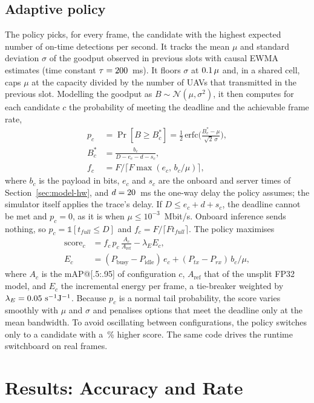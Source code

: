 \documentclass[journal,twocolumn,10pt]{IEEEtran}
\begin{document}
\subsection{Adaptive policy}
The policy picks, for every frame, the candidate with the highest expected number of on-time detections per second. It tracks the mean $\mu$ and standard deviation $\sigma$ of the goodput observed in previous slots with causal EWMA estimates (time constant $\tau=200$~ms). It floors $\sigma$ at $0.1\,\mu$ and, in a shared cell, caps $\mu$ at the capacity divided by the number of UAVs that transmitted in the previous slot. Modelling the goodput as $B\sim\mathcal{N}(\mu,\sigma^2)$, it then computes for each candidate $c$ the probability of meeting the deadline and the achievable frame rate,
\begin{align*}
p_c &= \Pr[B\ge B^\ast_c] = \tfrac12\,\mathrm{erfc}\Big(\frac{B^\ast_c-\mu}{\sqrt2\,\sigma}\Big),\\
B^\ast_c &= \frac{b_c}{D-e_c-d-s_c},\\
f_c &= F\big/\big\lceil F\max(e_c,\,b_c/\mu)\big\rceil,
\end{align*}
where $b_c$ is the payload in bits, $e_c$ and $s_c$ are the onboard and server times of Section~\ref{sec:model-hw}, and $d=20$~ms the one-way delay the policy assumes; the simulator itself applies the trace's delay. If $D\le e_c+d+s_c$, the deadline cannot be met and $p_c=0$, as it is when $\mu\le10^{-3}$~Mbit/s. Onboard inference sends nothing, so $p_c=\mathbb{1}[t_{full}\le D]$ and $f_c=F/\lceil F t_{full}\rceil$. The policy maximises
\begin{align*}
\mathrm{score}_c &= f_c\, p_c\, \frac{A_c}{A_{\mathrm{ref}}} - \lambda_E E_c,\\
E_c &= (P_{\mathrm{busy}}-P_{\mathrm{idle}})\,e_c+(P_{tx}-P_{rx})\,b_c/\mu,
\end{align*}
where $A_c$ is the mAP@[.5:.95] of configuration $c$, $A_{\mathrm{ref}}$ that of the unsplit FP32 model, and $E_c$ the incremental energy per frame, a tie-breaker weighted by $\lambda_E=0.05~\mathrm{s^{-1}J^{-1}}$. Because $p_c$ is a normal tail probability, the score varies smoothly with $\mu$ and $\sigma$ and penalises options that meet the deadline only at the mean bandwidth. To avoid oscillating between configurations, the policy switches only to a candidate with a \PolicyHysteresisPct\,\% higher score. The same code drives the runtime switchboard on real frames.

\section{Results: Accuracy and Rate}
\end{document}
